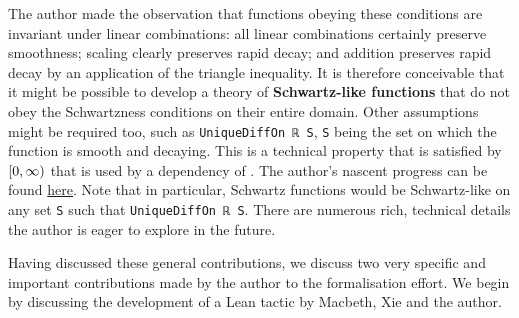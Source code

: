 The author made the observation that functions obeying these conditions are invariant under linear combinations: all linear combinations certainly preserve smoothness; scaling clearly preserves rapid decay; and addition preserves rapid decay by an application of the triangle inequality. It is therefore conceivable that it might be possible to develop a theory of \textbf{Schwartz-like functions} that do not obey the Schwartzness conditions on their entire domain. Other assumptions might be required too, such as \lstinline|UniqueDiffOn ℝ S|, \lstinline|S| being the set on which the function is smooth and decaying. This is a technical property that is satisfied by $\left[0, \infty\right)$ that is used by a dependency of . The author's nascent progress can be found \href{https://github.com/thefundamentaltheor3m/Sphere-Packing-Lean/blob/b1d9ae9aed06b87cb811fc4b94c2c659519053b0/SpherePacking/ForMathlib/RadialSchwartz/SchwartzLike.lean#L1}{here}. Note that in particular, Schwartz functions would be Schwartz-like on any set \lstinline|S| such that \lstinline|UniqueDiffOn ℝ S|. There are numerous rich, technical details the author is eager to explore in the future.

Having discussed these general contributions, we discuss two very specific and important contributions made by the author to the formalisation effort. We begin by discussing the development of a Lean tactic by Macbeth, Xie and the author.